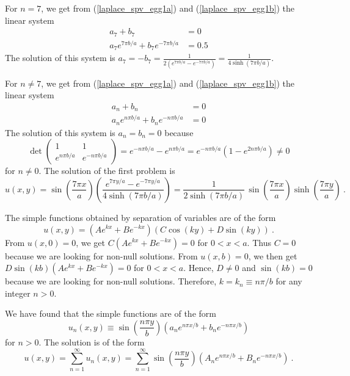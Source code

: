 \begin{egg}
For $n=7$, we get from (\ref{laplace_spv_egg1a}) and
(\ref{laplace_spv_egg1b}) the linear system
\begin{align*}
a_7 + b_7 &= 0 \\
a_7 e^{7\pi b/a} + b_7 e^{-7\pi b/a} &= 0.5
\end{align*}
The solution of this system is
$\displaystyle
a_7 = -b_7 =\frac{1}{\displaystyle 2\left( e^{7\pi b/a} - e^{-7\pi b/a}\right)}
= \frac{1}{4 \sinh(7\pi b/a)}$.

For $n\neq 7$, we get from (\ref{laplace_spv_egg1a}) and
(\ref{laplace_spv_egg1b}) the linear system
\begin{align*}
a_n + b_n &= 0 \\
a_n e^{n\pi b/a} + b_n e^{-n\pi b/a} &= 0
\end{align*}
The solution of this system is $a_n = b_n = 0$ because
\[
\det
\begin{pmatrix}
1 & 1 \\
e^{n\pi b/a} & e^{-n\pi b/a}
\end{pmatrix}
= e^{-n\pi b/a}-e^{n\pi b/a} =
e^{-n\pi b/a} \left( 1 - e^{2n\pi b/a}\right) \neq 0
\]
for $n\neq 0$.  The solution of the first problem is
\begin{equation} \label{laplace_spv_egg1c}
u(x,y) = \sin\left(\frac{7\pi x}{a}\right)
\left(\frac{e^{7\pi y/a} - e^{-7\pi y/a}}{4 \sinh(7\pi b/a)} \right)
= \frac{1}{2 \sinh(7\pi b/a)}\, \sin\left(\frac{7\pi x}{a}\right)
\sinh\left(\frac{7\pi y}{a}\right) \ .
\end{equation}

The simple functions obtained by separation of variables are of the
form
\[
u(x,y) = \left( A e^{kx} + B e^{-kx} \right)
\left(C \cos(ky) + D \sin(ky)\right) \  .
\]
From $u(x,0) = 0$, we get $C \left(A e^{kx} + B e^{-kx}\right)=0$ for
$0<x<a$.  Thus $C=0$ because we are looking for non-null solutions.
From $u(x,b) = 0$, we then get
$D\sin(kb)\left(A e^{kx} + B e^{-kx}\right)=0$ for $0<x<a$.  Hence,
$D \neq 0$ and $\sin(kb)=0$ because we are looking for non-null
solutions.  Therefore, $k = k_n \equiv n\pi/b$ for any integer $n>0$.

We have found that the simple functions are of the form
\[
u_n(x,y) \equiv \sin\left(\frac{n\pi y}{b}\right)
\left(a_n e^{n\pi x/b} + b_n e^{-n\pi x/b}\right)
\]
for $n > 0$.  The solution is of the form
\[
u(x,y) = \sum_{n=1}^\infty u_n(x,y) = 
\sum_{n=1}^\infty \sin\left(\frac{n\pi y}{b}\right)
\left(A_n e^{n\pi x/b} + B_n e^{-n\pi x/b}\right) \ .
\]


\end{egg}
